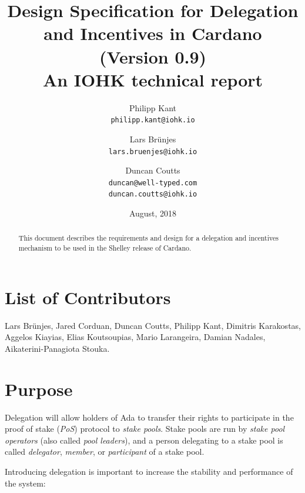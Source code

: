 \documentclass[11pt,a4paper]{article}
\begin{document}
\title{Design Specification for Delegation and Incentives in Cardano \\
       {\small (Version 0.9)} \\
       {\large \sc An IOHK technical report}}

\author{Philipp Kant   \\ {\small \texttt{philipp.kant@iohk.io}} \\
   \and Lars Br\"unjes \\ {\small \texttt{lars.bruenjes@iohk.io}} \\
   \and Duncan Coutts  \\ {\small \texttt{duncan@well-typed.com}} \\
                          {\small \texttt{duncan.coutts@iohk.io}}}
\date{August, 2018}

\maketitle

\begin{abstract}
This document describes the requirements and design for a delegation and
incentives mechanism to be used in the Shelley release of Cardano.
\end{abstract}

\section*{List of Contributors}
\label{acknowledgements}

Lars Br\"unjes, Jared Corduan, Duncan Coutts, Philipp Kant,
Dimitris Karakostas, Aggelos Kiayias, Elias Koutsoupias, Mario
Larangeira, Damian Nadales, Aikaterini-Panagiota Stouka.

\tableofcontents
\listoffigures
\listoftodos

\section{Purpose}
\label{purpose}

Delegation will allow holders of Ada to transfer their rights to
participate in the proof of stake (\emph{PoS}) protocol to \emph{stake
pools}. Stake pools are run by \emph{stake pool operators} (also called
\emph{pool leaders}), and a person delegating to a stake pool is called
\emph{delegator}, \emph{member}, or \emph{participant} of a stake pool.

Introducing delegation is important to increase the stability and
performance of the system:
\end{document}

